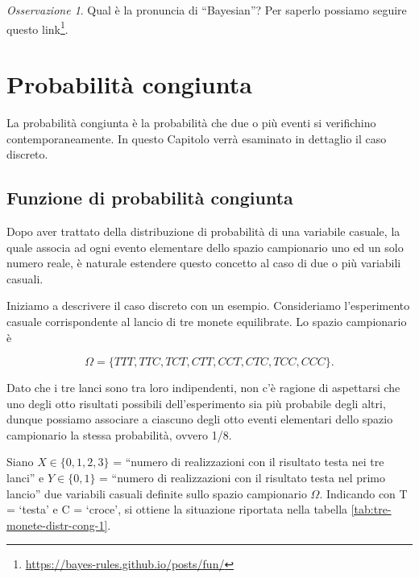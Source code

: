 \documentclass[
  11pt,
]{krantz}
\renewcommand{\href}[2]{#2\footnote{\url{#1}}}
\theoremstyle{definition}
\theoremstyle{definition}
\theoremstyle{definition}
\theoremstyle{definition}
\theoremstyle{remark}
\newtheorem*{remark}{Osservazione}
\begin{document}
\begin{remark}
Qual è la pronuncia di ``Bayesian''? Per saperlo possiamo seguire \href{https://bayes-rules.github.io/posts/fun/}{questo link}.
\end{remark}

\hypertarget{chapter-prob-congiunta}{%
\chapter{Probabilità congiunta}\label{chapter-prob-congiunta}}

La probabilità congiunta è la probabilità che due o più eventi si verifichino contemporaneamente. In questo Capitolo verrà esaminato in dettaglio il caso discreto.

\hypertarget{funzione-di-probabilituxe0-congiunta}{%
\section{Funzione di probabilità congiunta}\label{funzione-di-probabilituxe0-congiunta}}

Dopo aver trattato della distribuzione di probabilità di una variabile casuale, la quale associa ad ogni evento elementare dello spazio campionario uno ed un solo numero reale, è naturale estendere questo concetto al caso di due o più variabili casuali.

Iniziamo a descrivere il caso discreto con un esempio. Consideriamo l'esperimento casuale corrispondente al lancio di tre monete equilibrate. Lo spazio campionario è

\[
\Omega = \{TTT, TTC, TCT, CTT, CCT, CTC, TCC, CCC\}.
\]

Dato che i tre lanci sono tra loro indipendenti, non c'è ragione di aspettarsi che uno degli otto risultati possibili dell'esperimento sia più probabile degli altri, dunque possiamo associare a ciascuno degli otto eventi elementari dello spazio campionario la stessa probabilità, ovvero 1/8.

Siano \(X \in \{0, 1, 2, 3\}\) = ``numero di realizzazioni con il risultato testa nei tre lanci'' e \(Y \in \{0, 1\}\) = ``numero di realizzazioni con il risultato testa nel primo lancio'' due variabili casuali definite sullo spazio campionario \(\Omega\). Indicando con T = `testa' e C = `croce', si ottiene la situazione riportata nella tabella \ref{tab:tre-monete-distr-cong-1}.
\end{document}
